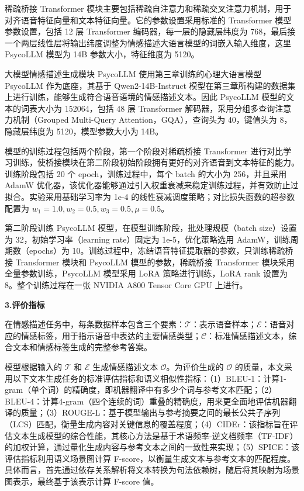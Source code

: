 稀疏桥接 Transformer 模块主要包括稀疏自注意力和稀疏交叉注意力机制，用于对齐语音特征向量和文本特征向量。它的参数设置采用标准的 Transformer 模型参数设置，包括 12 层 Transformer 编码器，每一层的隐藏层纬度为 768，最后接一个两层线性层将输出纬度调整为情感描述大语言模型的词嵌入输入维度，这里 PsycoLLM 模型为 14B 参数大小，特征维度为 5120。

大模型情感描述生成模块 PsycoLLM 使用第三章训练的心理大语言模型 PsycoLLM 作为底座，其基于 Qwen2-14B-Instruct 模型在第三章所构建的数据集上进行训练，能够生成符合语音语境的情感描述文本。因此 PsycoLLM 模型的文本的词表大小为 152064，包括 48 层 Transformer 解码器，采用分组多查询注意力机制（Grouped Multi-Query Attention，GQA），查询头为 40，键值头为 8，隐藏层纬度为 5120，模型参数大小为 14B。

模型的训练过程包括两个阶段，第一个阶段对稀疏桥接 Transformer 进行对比学习训练，使桥接模块在第二阶段初始阶段拥有更好的对齐语音到文本特征的能力。训练阶段包括 20 个 epoch，训练过程中，每个 batch 的大小为 256，并且采用 AdamW 优化器，该优化器能够通过引入权重衰减来稳定训练过程，并有效防止过拟合。实验采用基础学习率为 1e-4 的线性衰减调度策略；对比损失函数的超参数配置为 $w_1 = 1.0, w_2 = 0.5, w_3 = 0.5, \mu = 0.5$。

第二阶段训练 PsycoLLM 模型，在模型训练阶段，批处理规模（batch size）设置为 32，初始学习率（learning rate）固定为 1e-5，优化策略选用 AdamW，训练周期数（epochs）为 10。训练过程中，冻结语音特征提取器的参数，只训练稀疏桥接 Transformer 模块和 PsycoLLM 模型的参数，稀疏桥接 Transformer 模块采用全量参数训练，PsycoLLM 模型采用 LoRA 策略进行训练，LoRA rank 设置为 8。整个训练过程在一张 NVIDIA A800 Tensor Core GPU 上进行。

\textbf{3.评价指标}

在情感描述任务中，每条数据样本包含三个要素：$\mathcal{T}$：表示语音样本；$\mathcal{E}$：语音对应的情感标签，用于指示语音中表达的主要情感类型；$\mathcal{C}$：标准情感描述文本，综合文本和情感标签生成的完整参考答案。

模型根据输入的 $\mathcal{T}$ 和 $\mathcal{E}$ 生成情感描述文本 $\mathcal{O}$。为评价生成的 $\mathcal{O}$ 的质量，本文采用以下文本生成任务的标准评估指标和语义相似性指标：（1）BLEU-1：计算1-gram（单个词）的精确度，即机器翻译中有多少个词与参考文本匹配；（2）BLEU-4：计算4-gram（四个连续的词）重叠的精确度，用来更全面地评估机器翻译的质量；（3）ROUGE-L：基于模型输出与参考摘要之间的最长公共子序列（LCS）匹配，衡量生成内容对关键信息的覆盖程度；（4）CIDEr：该指标旨在评估文本生成模型的综合性能，其核心方法是基于术语频率-逆文档频率（TF-IDF）的加权计算，通过量化生成内容与参考文本之间的一致性来实现；（5）SPICE：该评估指标利用语义场景图计算 F-score，以衡量生成文本与参考文本的匹配程度。具体而言，首先通过依存关系解析将文本转换为句法依赖树，随后将其映射为场景图表示，最终基于该表示计算 F-score 值。

